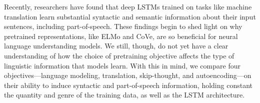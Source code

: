 Recently, researchers have found that deep LSTMs trained on tasks like machine translation learn substantial syntactic and semantic information about their input sentences, including part-of-speech. These findings begin to shed light on why pretrained representations, like ELMo and CoVe, are so beneficial for neural language understanding models. We still, though, do not yet have a clear understanding of how the choice of pretraining objective affects the type of linguistic information that models learn. With this in mind, we compare four objectives---language modeling, translation, skip-thought, and autoencoding---on their ability to induce syntactic and part-of-speech information, holding constant the quantity and genre of the training data, as well as the LSTM architecture.
